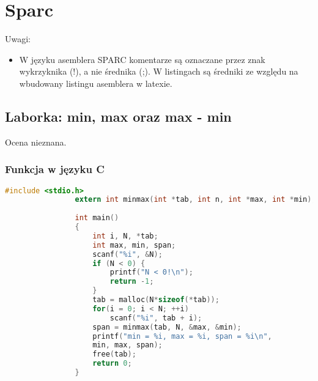 \newpage

\section{Sparc}
	Uwagi:
	\begin{itemize}
		\item W języku asemblera SPARC komentarze są oznaczane przez znak wykrzyknika (!), a nie średnika (;). W listingach są średniki ze względu na wbudowany listingu asemblera w latexie.
	\end{itemize}
	
	\subsection{Laborka: min, max oraz max - min}
		Ocena nieznana.
		\subsubsection{Funkcja w języku C}
			\begin{lstlisting}[language=C]
				#include <stdio.h>
				extern int minmax(int *tab, int n, int *max, int *min);
				
				int main()
				{
					int i, N, *tab;
					int max, min, span;
					scanf("%i", &N);	
					if (N < 0) {
						printf("N < 0!\n");
						return -1;
					}
					tab = malloc(N*sizeof(*tab));
					for(i = 0; i < N; ++i)
						scanf("%i", tab + i);
					span = minmax(tab, N, &max, &min);
					printf("min = %i, max = %i, span = %i\n",
					min, max, span);
					free(tab);
					return 0;
				}
			\end{lstlisting}
		\newpage
